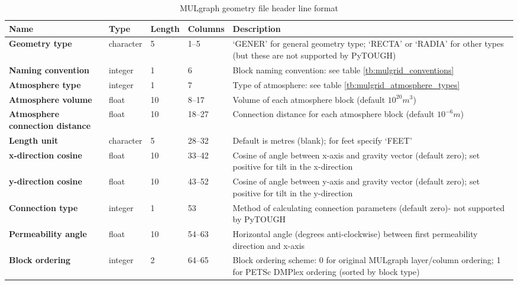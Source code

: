 \begin{table}
  \begin{center}
    \begin{tabular}{|p{20mm}|l|l|l|p{50mm}|}
      \hline
      \textbf{Name} & \textbf{Type} & \textbf{Length} & \textbf{Columns} & \textbf{Description}\\
      \hline
      \textbf{Geometry type} & character & 5 & 1--5 & `GENER' for general geometry type; `RECTA' or `RADIA' for other types (but these are not supported by PyTOUGH)\\
      \hline
      \textbf{Naming convention} & integer & 1 & 6 & Block naming convention: see table \ref{tb:mulgrid_conventions}\\
      \hline
      \textbf{Atmosphere type} & integer & 1 & 7 & Type of atmosphere: see table \ref{tb:mulgrid_atmosphere_types}\\
      \hline
      \textbf{Atmosphere volume} & float & 10 & 8--17 & Volume of each atmosphere block (default $10^{20} m^3$)\\
      \hline
      \textbf{Atmosphere connection distance} & float & 10 & 18--27 & Connection distance for each atmosphere block (default $10^{-6} m$) \\
      \hline
      \textbf{Length unit} & character & 5 & 28--32 & Default is metres (blank); for feet specify `FEET'\\
      \hline
      \textbf{x-direction cosine} & float & 10 & 33--42 & Cosine of angle between x-axis and gravity vector (default zero); set positive for tilt in the x-direction\\
      \hline
      \textbf{y-direction cosine} & float & 10 & 43--52 & Cosine of angle between y-axis and gravity vector (default zero); set positive for tilt in the y-direction\\
      \hline
      \textbf{Connection type} & integer & 1 & 53 & Method of calculating connection parameters (default zero)- not supported by PyTOUGH\\
      \hline
      \textbf{Permeability angle} & float & 10 & 54--63 & Horizontal angle (degrees anti-clockwise) between first permeability direction and x-axis\\
      \hline
      \textbf{Block ordering} & integer & 2 & 64--65 & Block ordering scheme: 0 for original MULgraph layer/column ordering; 1 for PETSc DMPlex ordering (sorted by block type)\\
      \hline
    \end{tabular}
    \caption{MULgraph geometry file header line format}
    \label{tb:mulgraph_format_header}
  \end{center}
\end{table}

